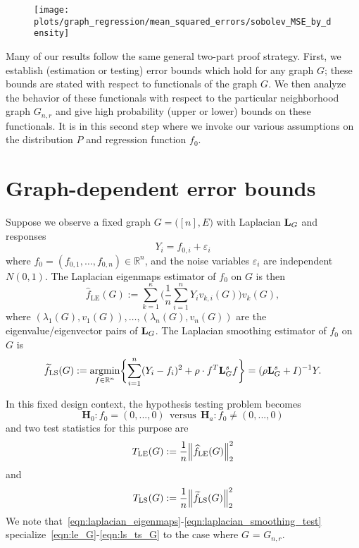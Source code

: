 \documentclass{article}
\newcommand{\Reals}{\mathbb{R}}
\newcommand{\1}{\mathbf{1}}
\DeclareMathOperator*{\argmin}{argmin}
\newcommand{\Lap}{{\bf L}}
\newcommand{\Id}{I}
\newcommand{\wt}[1]{\widetilde{#1}}
\newcommand{\wh}[1]{\widehat{#1}}
\newcommand{\LE}{\mathrm{LE}}
\newcommand{\LS}{\mathrm{LS}}
\theoremstyle{alden}
\theoremstyle{aldenthm}
\theoremstyle{definition}
\theoremstyle{remark}
\begin{document}
\begin{figure}
	\centering
	\texttt{[image: plots/graph\_regression/mean\_squared\_errors/sobolev\_MSE\_by\_density]}
	\caption{}
	\label{fig:piecewise_cosine}
\end{figure}

\clearpage

\appendix

Many of our results follow the same general two-part proof strategy. First, we establish (estimation or testing) error bounds which hold for any graph $G$; these bounds are stated with respect to functionals of the graph $G$. We then analyze the behavior of these functionals with respect to the particular neighborhood graph $G_{n,r}$ and give high probability (upper or lower) bounds on these functionals. It is in this second step where we invoke our various assumptions on the distribution $P$ and regression function $f_0$.

\section{Graph-dependent error bounds}
\label{sec:fixed_graph_error_bounds}

Suppose we observe a fixed graph $G = \bigl([n],E\bigr)$ with Laplacian $\Lap_G$ and responses
\begin{equation}
\label{eqn:fixed_graph_regression_model}
Y_i = f_{0,i} + \varepsilon_i
\end{equation}
where $f_0 = (f_{0,1},\ldots,f_{0,n}) \in \Reals^n$, and the noise variables $\varepsilon_i$ are independent $N(0,1)$. The Laplacian eigenmaps estimator of $f_0$ on $G$ is then
\begin{equation}
\label{eqn:le_G}
\wh{f}_{\LE}(G) := \sum_{k = 1}^{\kappa} \biggl(\frac{1}{n}\sum_{i = 1}^{n} Y_i v_{k,i}(G) \biggr) v_k(G),
\end{equation}
where $(\lambda_1(G),v_1(G)),\ldots,(\lambda_n(G),v_n(G))$ are the eigenvalue/eigenvector pairs of $\Lap_G$. The Laplacian smoothing estimator of $f_0$ on $G$ is
\begin{equation}
\label{eqn:ls_G}
\wt{f}_{\LS}(G) := \argmin_{f \in \Reals^n} \biggl\{ \sum_{i = 1}^{n}(Y_i - f_i)^2 + \rho \cdot f^T \Lap_G^{s}  f \biggr\} = (\rho \Lap_G^s + \Id)^{-1}Y.
\end{equation}

In this fixed design context, the hypothesis testing problem becomes
\begin{equation*}
\mathbf{H}_0: f_{0} = (0,...,0) ~~\textrm{versus}~~ \mathbf{H}_a: f_{0} \neq (0,...,0)
\end{equation*}
and two test statistics for this purpose are
\begin{equation}
\label{eqn:le_ts_G}
T_{\LE}(G) := \frac{1}{n} \Bigl\|\wh{f}_{\LE}(G)\Bigr\|_2^2 
\end{equation}
and
\begin{equation}
\label{eqn:ls_ts_G}
T_{\LS}(G) := \frac{1}{n} \Bigl\|\wt{f}_{\LS}(G)\Bigr\|_2^2 
\end{equation}
We note that~\eqref{eqn:laplacian_eigenmaps}-\eqref{eqn:laplacian_smoothing_test} specialize~\eqref{eqn:le_G}-\eqref{eqn:ls_ts_G} to the case where $G$ = $G_{n,r}$.
\end{document}

